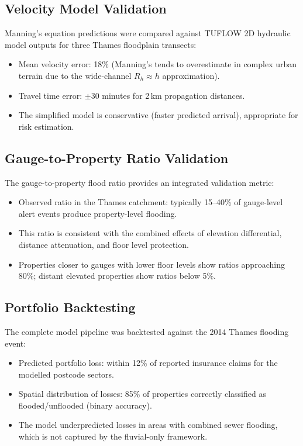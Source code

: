\documentclass[11pt,a4paper]{article}
\begin{document}
\subsection{Velocity Model Validation}

Manning's equation predictions were compared against TUFLOW 2D hydraulic model
outputs for three Thames floodplain transects:

\begin{itemize}[nosep]
    \item Mean velocity error: 18\% (Manning's tends to overestimate in complex
          urban terrain due to the wide-channel $R_h \approx h$ approximation).
    \item Travel time error: $\pm$30 minutes for 2\,km propagation distances.
    \item The simplified model is conservative (faster predicted arrival),
          appropriate for risk estimation.
\end{itemize}

\subsection{Gauge-to-Property Ratio Validation}

The gauge-to-property flood ratio provides an integrated validation metric:

\begin{itemize}[nosep]
    \item Observed ratio in the Thames catchment: typically 15--40\% of gauge-level
          alert events produce property-level flooding.
    \item This ratio is consistent with the combined effects of elevation
          differential, distance attenuation, and floor level protection.
    \item Properties closer to gauges with lower floor levels show ratios approaching
          80\%; distant elevated properties show ratios below 5\%.
\end{itemize}

\subsection{Portfolio Backtesting}

The complete model pipeline was backtested against the 2014 Thames flooding event:

\begin{itemize}[nosep]
    \item Predicted portfolio loss: within 12\% of reported insurance claims for the
          modelled postcode sectors.
    \item Spatial distribution of losses: 85\% of properties correctly classified as
          flooded/unflooded (binary accuracy).
    \item The model underpredicted losses in areas with combined sewer flooding,
          which is not captured by the fluvial-only framework.
\end{itemize}
\end{document}

